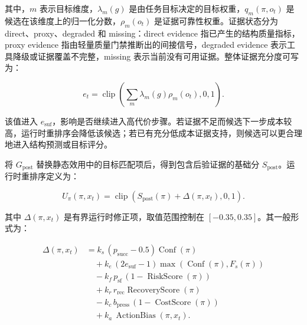 其中，$m$ 表示目标维度，$\lambda_m(g)$
是由任务目标决定的目标权重，$q_m(\pi,o_t)$
是候选在该维度上的归一化分数，$\rho_m(o_t)$
是证据可靠性权重。证据状态分为 direct、proxy、degraded 和
missing：direct evidence 指已产生的结构质量指标，proxy evidence
指由轻量质量门禁推断出的间接信号，degraded evidence
表示工具降级或证据覆盖不完整，missing
表示当前没有可用证据。整体证据充分度可写为：

\begin{equation}
e_t=\operatorname{clip}\left(\sum_m \lambda_m(g)\rho_m(o_t),0,1\right).
\end{equation}

\begin{symboldefs}
\end{symboldefs}

该值进入
$e_{\mathrm{suf}}$，影响是否继续进入高代价步骤。若证据不足而候选下一步成本较高，运行时重排序会降低该候选；若已有充分低成本证据支持，则候选可以更合理地进入结构预测或目标评分。

将 $G_{\mathrm{post}}$
替换静态效用中的目标匹配项后，得到包含后验证据的基础分
$S_{\mathrm{post}}$。运行时重排序定义为：

\begin{equation}
U_{\pi}(\pi,x_t)
=\operatorname{clip}\left(S_{\mathrm{post}}(\pi)+\Delta(\pi,x_t),0,1\right).
\end{equation}

\begin{symboldefs}
\end{symboldefs}

其中 $\Delta(\pi,x_t)$ 是有界运行时修正项，取值范围控制在
$[-0.35,0.35]$。其一般形式为：

\begin{equation}
\begin{aligned}
\Delta(\pi,x_t)
  &= k_s\,(p_{\mathrm{succ}}-0.5)\operatorname{Conf}(\pi)\\
  &\quad{}+k_e\,(2e_{\mathrm{suf}}-1)
       \max(\operatorname{Conf}(\pi),F_s(\pi))\\
  &\quad{}-k_f\,p_{\mathrm{sf}}\,(1-\operatorname{RiskScore}(\pi))\\
  &\quad{}+k_r\,r_{\mathrm{rec}}\operatorname{RecoveryScore}(\pi)\\
  &\quad{}-k_c\,b_{\mathrm{press}}\,(1-\operatorname{CostScore}(\pi))\\
  &\quad{}+k_a\,\operatorname{ActionBias}(\pi,x_t).
\end{aligned}
\end{equation}

